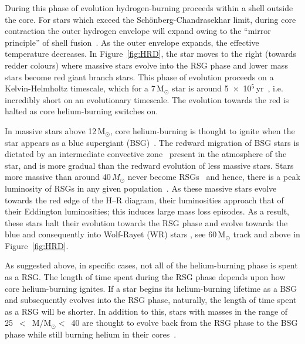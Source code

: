 During this phase of evolution hydrogen-burning proceeds within a shell outside the core.
For stars which exceed the Sch\"onberg-Chandrasekhar limit, during core contraction the outer hydrogen envelope will expand owing to the ``mirror principle'' of shell fusion~\citep[e.g.][]{2012MNRAS.421.2713B}.\footnotemark
As the outer envelope expands, the effective temperature decreases.
In Figure~\ref{fig:HRD}, the star moves to the right (towards redder colours) where massive stars evolve into the RSG phase and lower mass stars become red giant branch stars.
This phase of evolution proceeds on a Kelvin-Helmholtz timescale, which for a 7\,M$_{\odot}$ star is around 5~$\times$~10$^{5}$\,yr~\citep{2012sse..book.....K}, i.e. incredibly short on an evolutionary timescale.
The evolution towards the red is halted as core helium-burning switches on.


In massive stars above 12\,M$_{\odot}$, core helium-burning is thought to ignite when the star appears as a blue supergiant (BSG)~\citep{Meynet11,2012A&A...537A.146E,Langer12,Saio13}.
The redward migration of BSG stars is dictated by an intermediate convective zone~\citep{Meynet11} present in the atmosphere of the star, and is more gradual than the redward evolution of less massive stars.
Stars more massive than around 40\,$M_{\odot}$ never become RSGs~\citep{Massey03,Meynet11,2012A&A...537A.146E} and hence, there is a peak luminosity of RSGs in any given population~\citep{1979ApJ...232..409H}.
As these massive stars evolve towards the red edge of the H--R diagram, their luminosities approach that of their Eddington luminosities; this induces large mass loss episodes.
As a result, these stars halt their evolution towards the RSG phase and evolve towards the blue and consequently into Wolf-Rayet (WR) stars
\citep{2007ARA&A..45..177C, Vink09}, see 60\,M$_{\odot}$ track and above in Figure~\ref{fig:HRD}.

As suggested above, in specific cases, not all of the helium-burning phase is spent as a RSG.
The length of time spent during the RSG phase depends upon how core helium-burning ignites.
If a star begins its helium-burning lifetime as a BSG and subsequently evolves into the RSG phase, naturally, the length of time spent as a RSG will be shorter.
In addition to this, stars with masses in the range of 25~$<$~M/M$_{\odot}<$~40 are thought to evolve back from the RSG phase to the BSG phase while still burning helium in their cores~\citep{2012A&A...537A.146E}.

